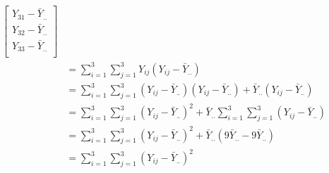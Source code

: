 \documentclass{article}
\begin{document}
\begin{enumerate}[leftmargin = 0 em, label = \arabic*., font = \bfseries]
\begin{align*}
\begin{bmatrix}
		Y_{31} - \bar{Y}_{..}\\
		Y_{32} - \bar{Y}_{..}\\
		Y_{33} - \bar{Y}_{..}\\
	\end{bmatrix}
	\\
	&= \sum_{i = 1}^3 \sum_{j = 1}^3 Y_{ij}(Y_{ij} - \bar{Y}_{..})\\
	& = \sum_{i = 1}^3 \sum_{j = 1}^3 (Y_{ij} - \bar{Y}_{..})(Y_{ij} - \bar{Y}_{..}) + \bar{Y}_{..}(Y_{ij} - \bar{Y}_{..})\\
	& = \sum_{i = 1}^3 \sum_{j = 1}^3 (Y_{ij} - \bar{Y}_{..})^2 + \bar{Y}_{..}\sum_{i = 1}^3 \sum_{j = 1}^3 (Y_{ij} - \bar{Y}_{..})\\
	& = \sum_{i = 1}^3 \sum_{j = 1}^3 (Y_{ij} - \bar{Y}_{..})^2 + \bar{Y}_{..}(9 \bar{Y}_{..} - 9 \bar{Y}_{..})\\
	& = \sum_{i = 1}^3 \sum_{j = 1}^3 (Y_{ij} - \bar{Y}_{..})^2
	\end{align*}

	\newpage


\end{enumerate}
\end{document}
